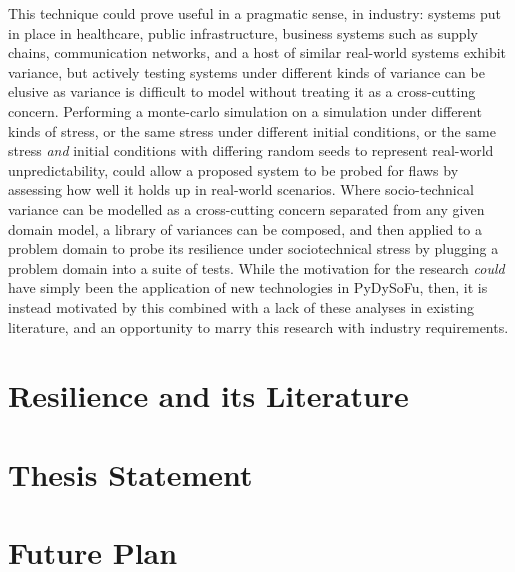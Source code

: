 \documentclass[draft]{article}
\begin{document}
This technique could prove useful in a pragmatic sense, in industry: systems put
in place in healthcare, public infrastructure, business systems such as supply
chains, communication networks, and a host of similar real-world systems exhibit
variance, but actively testing systems under different kinds of variance can be
elusive as variance is difficult to model without treating it as a cross-cutting
concern\cite{caise_forum_18}. Performing a monte-carlo simulation on a
simulation under different kinds of stress, or the same stress under different
initial conditions, or the same stress \emph{and} initial conditions with
differing random seeds to represent real-world unpredictability, could allow a
proposed system to be probed for flaws by assessing how well it holds up in
real-world scenarios. Where socio-technical variance can be modelled as a
cross-cutting concern separated from any given domain model, a library of
variances can be composed, and then applied to a problem domain to probe its
resilience under sociotechnical stress by plugging a problem domain into a suite
of tests. While the motivation for the research \emph{could} have simply been
the application of new technologies in PyDySoFu, then, it is instead motivated
by this combined with a lack of these analyses in existing literature, and an
opportunity to marry this research with industry requirements.\par



\section{Resilience and its Literature}
\label{sec:resilience}



\section{Thesis Statement}
\label{sec:thsis_statement}







\section{Future Plan}
\label{sec:future_plan}
\end{document}
